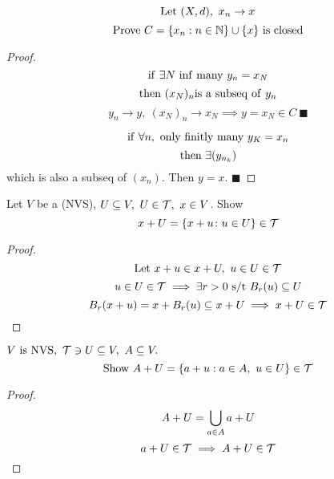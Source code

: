 \documentclass[12pt]{article}
\begin{document}
\bboxexam
\begin{exam}
    \[
        \mathrm{Let}\ (X,d),\ x_n\to x
    \]
    \[
        \mathrm{Prove}\
        C=\{x_n:n\in\mathbb N\}\cup\{x\}\ \mathrm{is}\ \mathrm{closed}
    \]
    \bboxproof
    \begin{proof}
        \[
            \iif\ \exists N\ \TR{inf\ many}\ y_n=x_N
        \]
        \[
            \tthen\ (x_N)_n\is\ \TR{a\ subseq\ of}\ y_n
        \]
        \[
            y_n\to y,\ (x_N)_n\to x_N\implies y=x_N\in C\ \blacksquare
        \]


        \[
            \iif\ \forall n,\ \TR{only\ finitly\ many}\ y_K=x_n
        \]
        \[
            \tthen\ \exists(y_{n_k})
        \]
        which is also a subseq of \((x_n)\). Then \(y=x\). \(\blacksquare\)
    \end{proof}
    \ebox
\end{exam}
\ebox


\bboxexam
\begin{exam}
    Let \(V\) be a (NVS), \(U\subseteq V,\ U\in\mathcal T,\ x\in V\). Show
    \[
        x+U=\{x+u\colon u\in U\}\in\mathcal T
    \]

    \bboxproof
    \begin{proof}
        \[
            \mathrm{Let}\ x+u\in x+U,\ u\in U\in\mathcal T
        \]
        \[
            u\in U\in\mathcal T\implies \exists r>0\text{ s/t }
            B_r(u)\subseteq U
        \]
        \[
            B_r(x+u)=x+B_r(u)\subseteq x+U\implies x+U\in\mathcal T
        \]
    \end{proof}
    \ebox
\end{exam}
\ebox

\bboxexam
\begin{exam}
    \(V\ \mathrm{is}\ \mathrm{NVS},\ \mathcal T\ni U\subseteq V,\ A\subseteq V.\)
    \[
        \TR{Show}\ A+U=\{a+u:a\in A,\ u\in U\}\in\TT
    \]
    \bboxproof
    \begin{proof}
        \[
            A+U=\bigcup_{a\in A}a+U
        \]
        \[
            a+U\in\mathcal T\implies A+U\in\mathcal T
        \]
    \end{proof}
    \ebox
\end{exam}
\ebox


\end{document}
